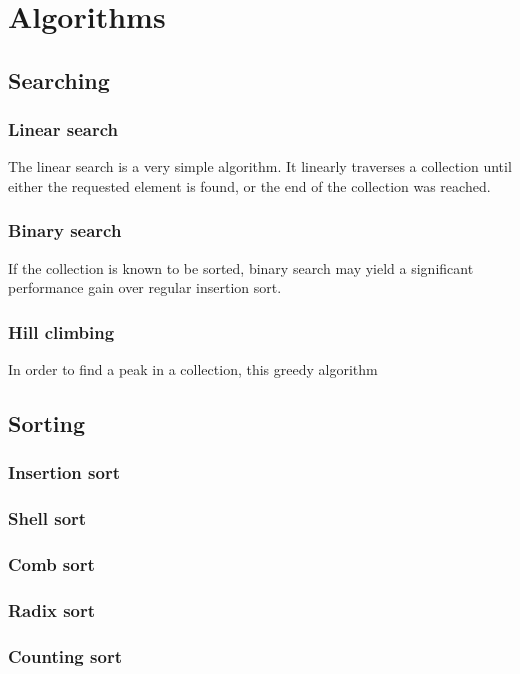 \documentclass{article}
\begin{document}
\newpage

\section{Algorithms}
\subsection{Searching}
\subsubsection{Linear search}
The linear search is a very simple algorithm. It linearly traverses a collection until either the requested
element is found, or the end of the collection was reached.

\subsubsection{Binary search}
If the collection is known to be sorted, binary search may yield a significant performance gain over regular insertion sort.

\subsubsection{Hill climbing}
In order to find a peak in a collection, this greedy algorithm 

\newpage

\subsection{Sorting}
\subsubsection{Insertion sort}
\subsubsection{Shell sort}
\subsubsection{Comb sort}
\subsubsection{Radix sort}
\subsubsection{Counting sort}
\end{document}

